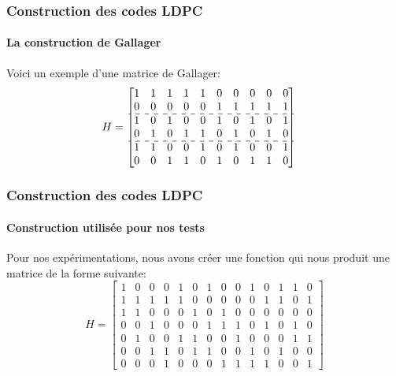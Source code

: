 \documentclass{beamer}
\begin{document}
    \begin{frame}
        \frametitle{Construction des codes LDPC}
        \framesubtitle{La construction de Gallager}
        Voici un exemple d'une matrice de Gallager:
        $$H=
        \begin{bmatrix}
            1 & 1 & 1 & 1 & 1 & 0 & 0 & 0 & 0 & 0 \\
            0 & 0 & 0 & 0 & 0 & 1 & 1 & 1 & 1 & 1 \\
            \hdashline
            1 & 0 & 1 & 0 & 0 & 1 & 0 & 1 & 0 & 1 \\
            0 & 1 & 0 & 1 & 1 & 0 & 1 & 0 & 1 & 0 \\
            \hdashline
            1 & 1 & 0 & 0 & 1 & 0 & 1 & 0 & 0 & 1 \\
            0 & 0 & 1 & 1 & 0 & 1 & 0 & 1 & 1 & 0 
        \end{bmatrix}
        \quad
        $$
    \end{frame}

    \begin{frame}
        \frametitle{Construction des codes LDPC}
        \framesubtitle{Construction utilisée pour nos tests}
        Pour nos expérimentations, nous avons créer une fonction qui nous produit une matrice de la forme suivante:
        \begin{equation*}
            H = \left[
            \begin{array}{cccccccccccccc}
                1&0&0&0&1&0&1&0&0&1&0&1&1&0 \\
                1&1&1&1&1&0&0&0&0&0&1&1&0&1 \\
                1&1&0&0&0&1&0&1&0&0&0&0&0&0 \\
                0&0&1&0&0&0&1&1&1&0&1&0&1&0 \\
                0&1&0&0&1&1&0&0&1&0&0&0&1&1 \\
                0&0&1&1&0&1&1&0&0&1&0&1&0&0 \\
                0&0&0&1&0&0&0&1&1&1&1&0&0&1 
            \end{array}
            \right]
        \end{equation*}
    \end{frame}
\end{document}
